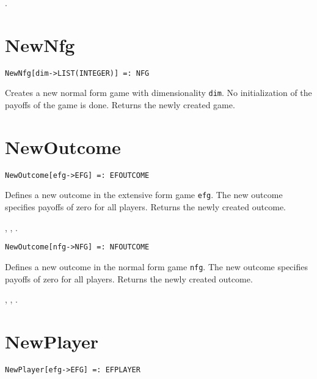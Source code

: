 \seealso {}.


\section*{NewNfg}\label{PrimNewNfg}
\begin{verbatim}
NewNfg[dim->LIST(INTEGER)] =: NFG 
\end{verbatim}

\noindent
Creates a new normal form game with dimensionality \verb+dim+.  No
initialization of the payoffs of the game is done.  Returns the newly
created game.  


\section*{NewOutcome}\label{PrimNewOutcome}
\begin{verbatim} 
NewOutcome[efg->EFG] =: EFOUTCOME 
\end{verbatim}

\noindent
Defines a new outcome in the extensive form game \verb+efg+.  The new
outcome specifies payoffs of zero for all players.  Returns the newly
created outcome.

\seealso {},
, .

\newsignature

\begin{verbatim}
NewOutcome[nfg->NFG] =: NFOUTCOME 
\end{verbatim}

\noindent
Defines a new outcome in the normal form game \verb+nfg+.  The new
outcome specifies payoffs of zero for all players.  Returns the newly
created outcome.

\seealso {},
, .


\section*{NewPlayer}\label{PrimNewPlayer}
\begin{verbatim}
NewPlayer[efg->EFG] =: EFPLAYER 
\end{verbatim}

